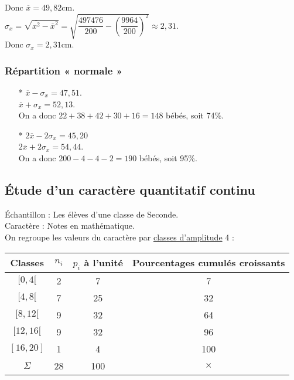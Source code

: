 Donc $\overline{x} = 49,82$cm. \\

$\sigma_x = \sqrt{\overline{x^2} - \overline{x}^2} = \sqrt{\dfrac{497476}{200} - \left(\dfrac{9964}{200}\right)^2} \approx 2,31$. \\

Donc $\sigma_x = 2,31$cm. \\

\subsubsection{Répartition « normale »}

\begin{itemize}
\item[*] $\overline{x} - \sigma_x = 47,51$. \\ $\overline{x} + \sigma_x = 52,13$. \\On a donc $22 + 38 + 42 + 30 + 16 = 148$ bébés, soit 74\%. 
\\
\item[*] $2\overline{x} - 2\sigma_x = 45,20$ \\ $2\overline{x} + 2\sigma_x = 54,44$. \\ On a donc $200 - 4 - 4 - 2 = 190$ bébés, soit 95\%. 
\end{itemize}

\newpage

\subsection{Étude d'un caractère quantitatif continu}

Échantillon : Les élèves d'une classe de Seconde. \\
Caractère : Notes en mathématique. \\

On regroupe les valeurs du caractère par \underline{classes d'amplitude} 4 : \\

\begin{tabular}{c|c|c|c}
Classes & $n_i$ & $p_i$ à l'unité & Pourcentages cumulés croissants \\
\hline
$[0,4[$ & 2 & 7 & 7 \\
$[4,8[$ & 7 & 25 & 32 \\
$[8,12[$ & 9 & 32 & 64 \\
$[12,16[$ & 9 & 32 & 96 \\
$[16,20]$ & 1 & 4 & 100 \\
\hline
$\Sigma$ & 28 & 100 & {\Large {$\times$}} \\
\end{tabular}

